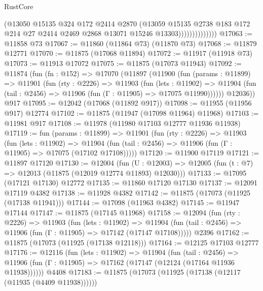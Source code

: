 \begin{lexlean}{RustCore}
\begin{coremodule}
                            (@13050
                              @15135
                              @324
                              @172
                              @2414
                              @2870
                              (@13059
                                @15135
                                @2738
                                @183
                                @172
                                @214
                                @27
                                @2414
                                @2469
                                @2868
                                @13071
                                @15246
                                @13303))))))))))))))
@17063 := @11858 @73
@17067 := @11860 (@11864 @73) (@11870 @73)
@17068 := @11879 @12771
@17070 := @11875 (@17068 @11894)
@17072 := @11917 (@11918 @73)
@17073 := @11913 @17072
@17075 := @11875 (@17073 @11943)
@17092 := @11874
    (fun (fn : @152) =>
    @17070
      (@11897
        (@11900
          (fun (params : @11899) =>
          @11901
            (fun (rty : @2226) =>
            @11903
              (fun (lets : @11902) =>
              @11904 (fun (tail : @2456) => @11906 (fun (Γ : @11905) => @17075 @11990))))))
        @12036))
    @917
@17095 := @12042 (@17068 (@11892 @917))
@17098 := @11955 (@11956 @917) @12774
@17102 := @11875 (@11947 (@17098 @11964) @11968)
@17103 := @11981 @917
@17108 := @11978 (@11980 @17103 @12777 @11936 @11938)
@17119 := fun (params : @11899) =>
  @11901
    (fun (rty : @2226) =>
    @11903
      (fun (lets : @11902) =>
      @11904 (fun (tail : @2456) => @11906 (fun (Γ : @11905) => @17075 (@17102 @17108)))))
@17120 := @11900 @17119
@17121 := @11897 @17120
@17130 := @12004
    (fun (U : @12003) => @12005 (fun (t : @7) => @12013 (@11875 (@12019 @12774 @11893) @12030)))
@17133 := @17095 (@17121 @17130) @12772
@17135 := @11860 @17120 @17130
@17137 := @12091 @17119 @4382
@17138 := @11928 @4382
@17142 := @11875 (@17073 (@11925 (@17138 @11941)))
@17144 := @17098 (@11963 @4382)
@17145 := @11947 @17144
@17147 := @11875 (@17145 @11968)
@17158 := @12094
    (fun (rty : @2226) =>
    @11903
      (fun (lets : @11902) =>
      @11904 (fun (tail : @2456) => @11906 (fun (Γ : @11905) => @17142 (@17147 @17108)))))
    @2396
@17162 := @11875 (@17073 (@11925 (@17138 @12118)))
@17164 := @12125 @17103 @12777
@17176 := @12116
    (fun (lets : @11902) =>
    @11904
      (fun (tail : @2456) =>
      @11906 (fun (Γ : @11905) => @17162 (@17147 (@12124 (@17164 @11936 @11938))))))
    @4408
@17183 := @11875 (@17073 (@11925 (@17138 (@12117 (@11935 (@4409 @11938))))))

\end{coremodule}
\end{lexlean}
